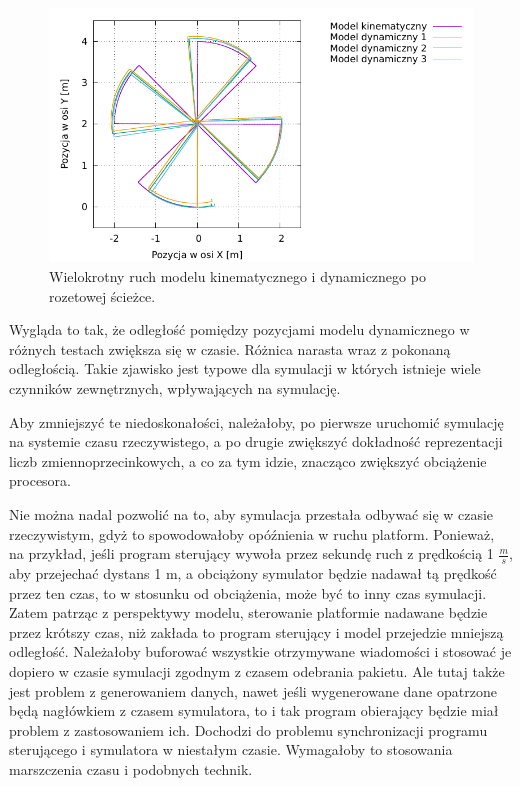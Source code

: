 		\begin{figure}[H]
			\centering
			\includegraphics[width=\textwidth]{plots/sun_3.pdf}
				\caption{Wielokrotny ruch modelu kinematycznego i dynamicznego po rozetowej ścieżce.}
			\label{plot:gramofon_sun_3}
		\end{figure}
		
		Wygląda to tak, że odległość pomiędzy pozycjami modelu dynamicznego w różnych testach zwiększa się w czasie.
		Różnica narasta wraz z pokonaną odległością.
		Takie zjawisko jest typowe dla symulacji w których istnieje wiele czynników zewnętrznych, wpływających na symulację.
		
		Aby zmniejszyć te niedoskonałości, należałoby, po pierwsze uruchomić symulację na systemie czasu rzeczywistego, a po drugie zwiększyć 
		dokładność reprezentacji liczb zmiennoprzecinkowych, a co za tym idzie, znacząco zwiększyć obciążenie procesora.
		
		Nie można nadal pozwolić na to, aby symulacja przestała odbywać się w czasie rzeczywistym, gdyż to spowodowałoby opóźnienia w ruchu platform.
		Ponieważ, na przykład, jeśli program sterujący wywoła przez sekundę ruch z prędkością 1 $\frac{m}{s}$, aby przejechać dystans 1 m,
		a obciążony symulator będzie nadawał tą prędkość przez ten czas, to w stosunku od obciążenia, może być to inny czas symulacji.
		Zatem patrząc z perspektywy modelu, sterowanie platformie nadawane będzie przez krótszy czas, niż zakłada to program sterujący i model przejedzie mniejszą odległość.
		Należałoby buforować wszystkie otrzymywane wiadomości i stosować je dopiero w czasie symulacji zgodnym z czasem odebrania pakietu. 
		Ale tutaj także jest problem z generowaniem danych, nawet jeśli wygenerowane dane opatrzone będą nagłówkiem z czasem symulatora, to i tak program obierający będzie miał
		problem z zastosowaniem ich. Dochodzi do problemu synchronizacji programu sterującego i symulatora w niestałym czasie. 
		Wymagałoby to stosowania marszczenia czasu i podobnych technik.
		
